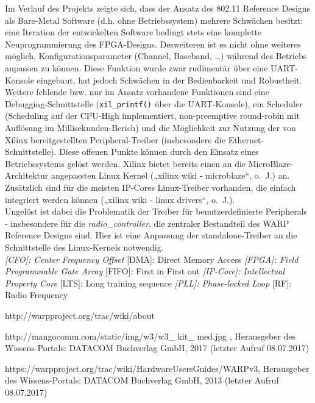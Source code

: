\documentclass[letterpaper,11pt]{article}
\begin{document}
\begin{onehalfspace}
Im Verlauf des Projekts zeigte sich, dass der Ansatz des 802.11
Reference Designs als Bare-Metal Software (d.h. ohne Betriebssystem)
mehrere Schwächen besitzt: eine Iteration der entwickelten Software
bedingt stets eine komplette Neuprogrammierung des FPGA-Designs.
Desweiteren ist es nicht ohne weiteres möglich, Konfigurationsparameter
(Channel, Baseband, \ldots{}) während des Betriebs anpassen zu können.
Diese Funktion wurde zwar rudimentär über eine UART-Konsole eingebaut,
hat jedoch Schwächen in der Bedienbarkeit und Robustheit.
Weitere fehlende bzw. nur im Ansatz vorhandene Funktionen sind eine
Debugging-Schnittstelle (\texttt{xil\_printf()} über die UART-Konsole),
ein Scheduler (Scheduling auf der CPU-High implementiert, non-preemptive
round-robin mit Auflösung im Millisekunden-Berich) und die Möglichkeit
zur Nutzung der von Xilinx bereitgestellten Peripheral-Treiber
(insbesondere die Ethernet-Schnittstelle).
Diese offenen Punkte können durch den Einsatz eines Betriebssystems
gelöst werden. Xilinx bietet bereits einen an die MicroBlaze-Architektur
angepassten Linux Kernel („xilinx wiki - microblaze``, o.~J.) an.
Zusätzlich sind für die meisten IP-Cores Linux-Treiber vorhanden, die
einfach integriert werden können („xilinx wiki - linux drivers``,
o.~J.).\\
Ungelöst ist dabei die Problematik der Treiber für benutzerdefinierte
Peripherals - insbesondere für die \emph{radio\_controller}, die
zentraler Bestandteil des WARP Reference Designs sind. Hier ist eine
Anpassung der standalone-Treiber an die Schnittstelle des Linux-Kernels
notwendig.\\
\emph{{[}CFO{]}: Center Frequency Offset }{[}DMA{]}: Direct Memory
Access \emph{{[}FPGA{]}: Field Programmable Gate Array }{[}FIFO{]}:
First in First out \emph{{[}IP-Core{]}: Intellectual Property Core
}{[}LTS{]}: Long training sequence \emph{{[}PLL{]}: Phase-locked Loop
}{[}RF{]}: Radio Frequency


\newpage
\thispagestyle{empty}
\listoffigures
\listoftables
\newpage
\thispagestyle{empty}


\begin{thebibliography}{xxxxxxxxxxxxxxxxxxx}


 http://warpproject.org/trac/wiki/about
 
  \bibitem[MANGO v3, 2017]{[2]}http://mangocomm.com/static/img/w3/w3\_ kit\_ med.jpg , Herausgeber des Wissens-Portals: DATACOM Buchverlag GmbH, 2017 (letzter Aufruf 08.07.2017)

 \bibitem[v3 Design, 2017]{[3]}https://warpproject.org/trac/wiki/HardwareUsersGuides/WARPv3,  Herausgeber des Wissens-Portals: DATACOM Buchverlag GmbH, 2013 (letzter Aufruf 08.07.2017)


\end{thebibliography}
\end{onehalfspace}
\end{document}
